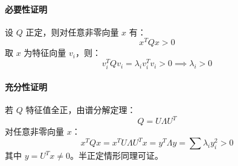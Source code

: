 \paragraph{必要性证明}  
设 \(Q\) 正定，则对任意非零向量 \(x\) 有：
\[
x^T Qx > 0
\]
取 \(x\) 为特征向量 \(v_i\)，则：
\[
v_i^T Qv_i = \lambda_i v_i^T v_i > 0 \implies \lambda_i > 0
\]

\paragraph{充分性证明}  
若 \(Q\) 特征值全正，由谱分解定理：
\[
Q = U\Lambda U^T
\]
对任意非零向量 \(x\)：
\[
x^T Qx = x^T U\Lambda U^T x = y^T \Lambda y = \sum \lambda_i y_i^2 > 0
\]
其中 \(y = U^T x \neq 0\)。半正定情形同理可证。